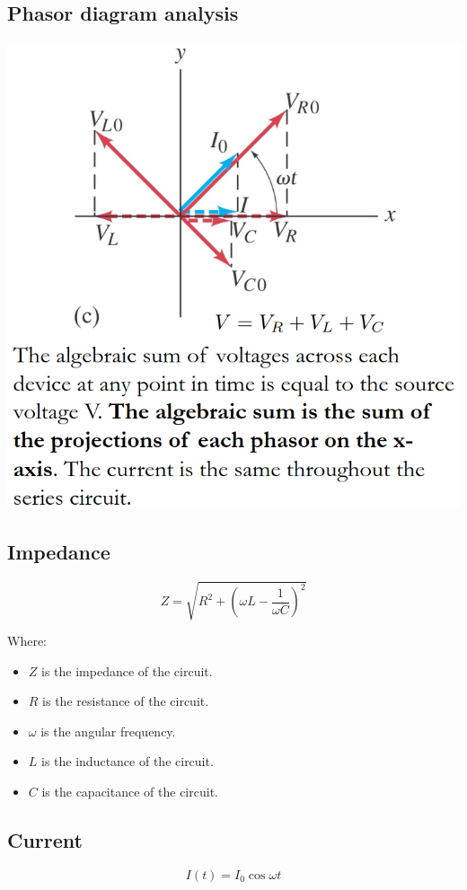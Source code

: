 \documentclass[11pt]{article}
\begin{document}
\subsection{Phasor diagram analysis}
\label{sec:orgb4cf904}
\begin{center}
\includegraphics[width=.9\linewidth]{./images/rcl-circuit-phasor-diagram.png}
\end{center}
\subsection{Impedance}
\label{sec:orgdae852d}
\[Z = \sqrt{R^2 + \left(\omega L - \frac{1}{\omega C} \right)^2}\]

Where:
\begin{itemize}
\item \(Z\) is the impedance of the circuit.
\item \(R\) is the resistance of the circuit.
\item \(\omega\) is the angular frequency.
\item \(L\) is the inductance of the circuit.
\item \(C\) is the capacitance of the circuit.
\end{itemize}
\subsection{Current}
\label{sec:orgc053a2f}
\[I(t) = I_0 \cos \omega t\]
\end{document}

